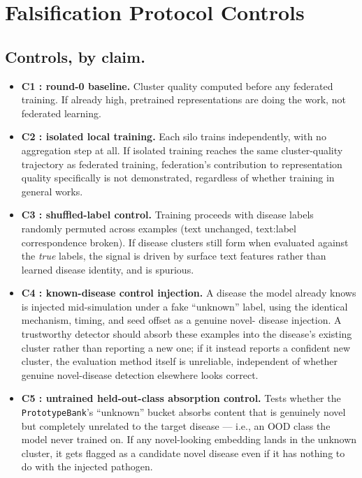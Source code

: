 \documentclass[utf8]{frontiers_suppmat} %
\begin{document}
\graphicspath{{paper_figures/}}

\onecolumn
{}

\title[Supplementary Material]{{}}


\maketitle

\section{Falsification Protocol Controls}
\label{sec:supp-falsification}

\subsection{Controls, by claim.}

\begin{itemize}
  \item \textbf{C1 : round-0 baseline.} Cluster quality computed before any
    federated training. If already high, pretrained representations are
    doing the work, not federated learning.
  \item \textbf{C2 : isolated local training.} Each silo trains
    independently, with no aggregation step at all. If isolated training
    reaches the same cluster-quality trajectory as federated training,
    federation's contribution to representation quality specifically is not
    demonstrated, regardless of whether training in general works.
  \item \textbf{C3 : shuffled-label control.} Training proceeds with
    disease labels randomly permuted across examples (text unchanged,
    text:label correspondence broken). If disease clusters still form when
    evaluated against the \emph{true} labels, the signal is driven by
    surface text features rather than learned disease identity, and is
    spurious.
  \item \textbf{C4 : known-disease control injection.} A disease the model
    already knows is injected mid-simulation under a fake ``unknown'' label,
    using the identical mechanism, timing, and seed offset as a genuine novel-
    disease injection. A trustworthy detector should absorb these examples
    into the disease's existing cluster rather than reporting a new one;
    if it instead reports a confident new cluster, the evaluation method
    itself is unreliable, independent of whether genuine novel-disease
    detection elsewhere looks correct.
  \item \textbf{C5 : untrained held-out-class absorption control.} Tests
    whether the \texttt{PrototypeBank}'s ``unknown'' bucket absorbs content
    that is genuinely novel but completely unrelated to the target disease
    --- i.e., an OOD class the model never trained on. If any novel-looking
    embedding lands in the unknown cluster, it gets flagged as a candidate
    novel disease even if it has nothing to do with the injected pathogen.
\end{itemize}
\end{document}
